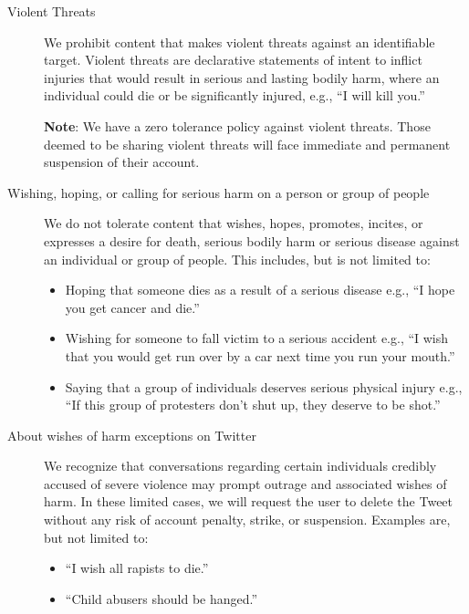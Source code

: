\begin{description}

\item[Violent Threats] \hfill

    We prohibit content that makes violent threats against an identifiable
    target. Violent threats are declarative statements of intent to inflict
    injuries that would result in serious and lasting bodily harm, where an
    individual could die or be significantly injured, e.g., ``I will kill you.''

    \textbf{Note}: We have a zero tolerance policy against violent threats.
    Those deemed to be sharing violent threats will face immediate and permanent
    suspension of their account.

\item[Wishing, hoping, or calling for serious harm on a person or group of
    people] \hfill

    We do not tolerate content that wishes, hopes, promotes, incites, or
    expresses a desire for death, serious bodily harm or serious disease against
    an individual or group of people. This includes, but is not limited to:

    \begin{itemize}
    \item Hoping that someone dies as a result of a serious disease e.g., ``I
        hope you get cancer and die.''
    \item Wishing for someone to fall victim to a serious accident e.g., ``I
        wish that you would get run over by a car next time you run your
        mouth.''
    \item Saying that a group of individuals deserves serious physical injury
        e.g., ``If this group of protesters don't shut up, they deserve to be
        shot.''
    \end{itemize}

\item[About wishes of harm exceptions on Twitter] \hfill

    We recognize that conversations regarding certain individuals credibly
    accused of severe violence may prompt outrage and associated wishes of harm.
    In these limited cases, we will request the user to delete the Tweet without
    any risk of account penalty, strike, or suspension. Examples are, but not
    limited to:

    \begin{itemize}
    \item ``I wish all rapists to die.''
    \item ``Child abusers should be hanged.''
    \end{itemize}


\end{description}
